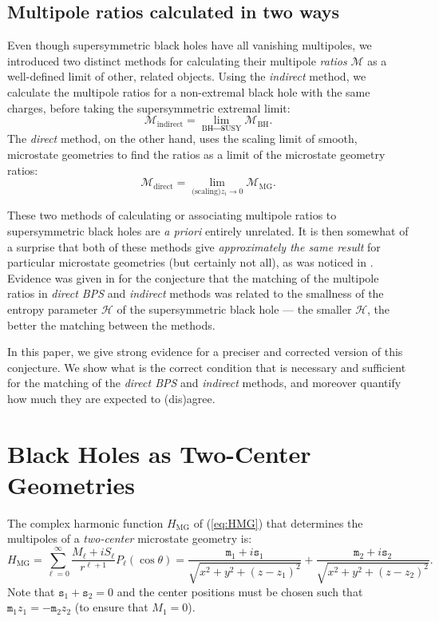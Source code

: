 \documentclass[12pt,a4paper]{article}
\newcommand{\be}{\begin{equation}}
\newcommand{\ee}{\end{equation}}
\newcommand{\mm}{\mathtt{m}}
\newcommand{\sm}{\mathtt{s}}
\def\indirect{\emph{indirect} }
\def\direct{\emph{direct BPS} }
\begin{document}
\subsection{Multipole ratios calculated in two ways}\label{sec:2ways}
Even though supersymmetric black holes have all vanishing multipoles, we introduced two distinct methods for calculating their multipole \emph{ratios} $\mathcal{M}$ as a well-defined limit of other, related objects. Using the \indirect method, we calculate the multipole ratios for a non-extremal black hole with the same charges, before taking the supersymmetric extremal limit:
\be \mathcal{M}_{\text{indirect}} = \lim_{\text{BH}\rightarrow \text{SUSY}} \mathcal{M}_{\text{BH}}.\ee
The \emph{direct} method, on the other hand, uses the scaling limit of smooth, microstate geometries to find the ratios as a limit of the microstate geometry ratios:
\be \mathcal{M}_{\text{direct}} = \lim_{\text{(scaling)} z_i\rightarrow 0} \mathcal{M}_{\text{MG}}.\ee

These two methods of calculating or associating multipole ratios to supersymmetric black holes are \emph{a priori} entirely unrelated. It is then somewhat of a surprise that both of these methods give \emph{approximately the same result} for particular microstate geometries (but certainly not all), as was noticed in \cite{Bena:2020see,Bena:2020uup}. Evidence was given in \cite{Bena:2020see,Bena:2020uup} for the conjecture that the matching of the multipole ratios in \direct and \indirect methods was related to the smallness of the entropy parameter $\mathcal{H}$ of the supersymmetric black hole --- the smaller $\mathcal{H}$, the better the matching between the methods.

In this paper, we give strong evidence for a preciser and corrected version of this conjecture. We show what is the correct condition that is necessary and sufficient for the matching of the \direct and \indirect methods, and moreover quantify how much they are expected to (dis)agree.




\section{Black Holes as Two-Center Geometries}\label{sec:BHtwocenter}

The complex harmonic function $H_\text{MG}$ of (\ref{eq:HMG}) that determines the multipoles of a \emph{two-center} microstate geometry is:
\be H_{\text{MG}} =  \sum_{\ell=0}^\infty \frac{M_\ell + i S_\ell}{r^{\ell+1}}P_{\ell}(\cos\theta) =  \frac{\mm_1 + i \sm_1}{\sqrt{x^2+y^2+(z-z_1)^2}}+\frac{\mm_2 + i \sm_2}{\sqrt{x^2+y^2+(z-z_2)^2}}.\ee
Note that $\sm_1+\sm_2=0$ and the center positions must be chosen such that $\mm_1 z_1 =- \mm_2 z_2$ (to ensure that $M_1=0$).
\end{document}
